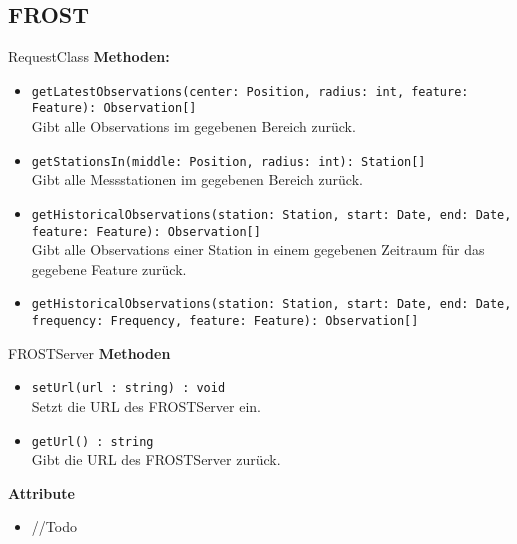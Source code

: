 \subsection{FROST}

\begin{Class}{RequestClass}
    \textbf{Methoden:}
    \begin{itemize}
        \item \texttt{getLatestObservations(center: Position, radius: int, feature: Feature): Observation[]}
        \\Gibt alle Observations im gegebenen Bereich zurück.
        \item \texttt{getStationsIn(middle: Position, radius: int): Station[]}
        \\Gibt alle Messstationen im gegebenen Bereich zurück.
        \item \texttt{getHistoricalObservations(station: Station, start: Date, end: Date, feature: Feature): Observation[]}
        \\Gibt alle Observations einer Station in einem gegebenen Zeitraum für das gegebene Feature zurück.
        \item \texttt{getHistoricalObservations(station: Station, start: Date, end: Date, frequency: Frequency, feature: Feature): Observation[]}
        
    \end{itemize}
\end{Class}

\begin{Class}{FROSTServer}
    \textbf{Methoden}
    \begin{itemize}
        \item \texttt{setUrl(url : string) : void}
        \\Setzt die URL des FROSTServer ein.
        \item \texttt{getUrl() : string}
        \\Gibt die URL des FROSTServer zurück.
    \end{itemize}
    
    \textbf{Attribute}
    \begin{itemize}
        \item //Todo
    \end{itemize}
\end{Class}


